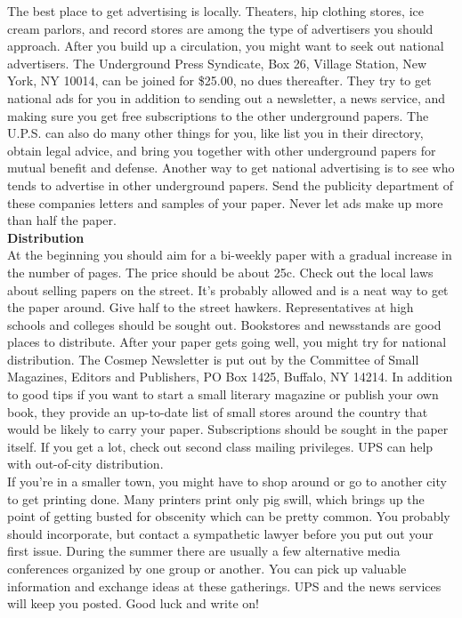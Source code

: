 \documentclass[11pt,twoside,a4paper]{book}
\begin{document}
The best place to get advertising is locally. Theaters, hip clothing stores, ice cream parlors, and record stores are among the type of advertisers you should approach. After you build up a circulation, you might want to seek out national advertisers. The Underground Press Syndicate, Box 26, Village Station, New York, NY 10014, can be joined for \$25.00, no dues thereafter. They try to get national ads for you in addition to sending out a newsletter, a news service, and making sure you get free subscriptions to the other underground papers. The U.P.S. can also do many other things for you, like list you in their directory, obtain legal advice, and bring you together with other underground papers for mutual benefit and defense. Another way to get national advertising is to see who tends to advertise in other underground papers. Send the publicity department of these companies letters and samples of your paper. Never let ads make up more than half the paper.~\\

\textbf{Distribution}~\\
At the beginning you should aim for a bi-weekly paper with a gradual increase in the number of pages. The price should be about 25c. Check out the local laws about selling papers on the street. It's probably allowed and is a neat way to get the paper around. Give half to the street hawkers. Representatives at high schools and colleges should be sought out. Bookstores and newsstands are good places to distribute. After your paper gets going well, you might try for national distribution. The Cosmep Newsletter is put out by the Committee of Small Magazines, Editors and Publishers, PO Box 1425, Buffalo, NY 14214. In addition to good tips if you want to start a small literary magazine or publish your own book, they provide an up-to-date list of small stores around the country that would be likely to carry your paper. Subscriptions should be sought in the paper itself. If you get a lot, check out second class mailing privileges. UPS can help with out-of-city distribution.~\\

If you're in a smaller town, you might have to shop around or go to another city to get printing done. Many printers print only pig swill, which brings up the point of getting busted for obscenity which can be pretty common. You probably should incorporate, but contact a sympathetic lawyer before you put out your first issue. During the summer there are usually a few alternative media conferences organized by one group or another. You can pick up valuable information and exchange ideas at these gatherings. UPS and the news services will keep you posted. Good luck and write on!
\end{document}
